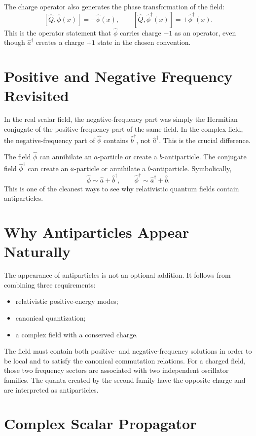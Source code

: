The charge operator also generates the phase transformation of the field:
\[
    [\hat Q,\hat\phi(x)] = -\hat\phi(x),
    \qquad
    [\hat Q,\hat\phi^\dagger(x)] = +\hat\phi^\dagger(x).
\]
This is the operator statement that \(\hat\phi\) carries charge \(-1\) as an
operator, even though \(\hat a^\dagger\) creates a charge \(+1\) state in the
chosen convention.

\section{Positive and Negative Frequency Revisited}

In the real scalar field, the negative-frequency part was simply the Hermitian
conjugate of the positive-frequency part of the same field. In the complex
field, the negative-frequency part of \(\hat\phi\) contains
\(\hat b^\dagger\), not \(\hat a^\dagger\). This is the crucial difference.

The field \(\hat\phi\) can annihilate an \(a\)-particle or create a
\(b\)-antiparticle. The conjugate field \(\hat\phi^\dagger\) can create an
\(a\)-particle or annihilate a \(b\)-antiparticle. Symbolically,
\[
    \hat\phi \sim \hat a + \hat b^\dagger,
    \qquad
    \hat\phi^\dagger \sim \hat a^\dagger + \hat b.
\]
This is one of the cleanest ways to see why relativistic quantum fields contain
antiparticles.

\section{Why Antiparticles Appear Naturally}

The appearance of antiparticles is not an optional addition. It follows from
combining three requirements:
\begin{itemize}
    \item relativistic positive-energy modes;
    \item canonical quantization;
    \item a complex field with a conserved charge.
\end{itemize}
The field must contain both positive- and negative-frequency solutions in order
to be local and to satisfy the canonical commutation relations. For a charged
field, those two frequency sectors are associated with two independent oscillator
families. The quanta created by the second family have the opposite charge and
are interpreted as antiparticles.

\section{Complex Scalar Propagator}

